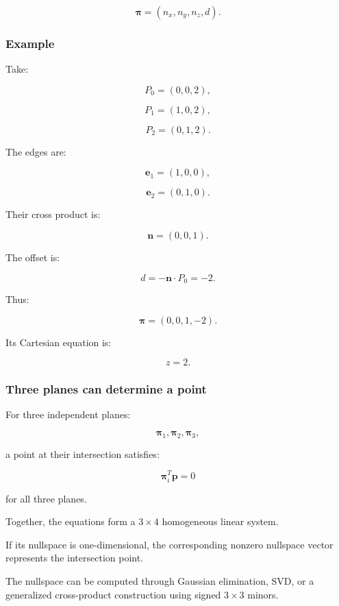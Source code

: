 \[
 \boxed{ \boldsymbol\pi= (n_x,n_y,n_z,d) }.
\]

\begin{allmightroleexample}

\subsubsection{Example}\label{02-foundations-ii-ch032-example}

Take:

\end{allmightroleexample}

\[
 P_0=(0,0,2),
\]

\[
 P_1=(1,0,2),
\]

\[
 P_2=(0,1,2).
\]

The edges are:

\[
 \mathbf e_1=(1,0,0),
\]

\[
 \mathbf e_2=(0,1,0).
\]

Their cross product is:

\[
 \mathbf n=(0,0,1).
\]

The offset is:

\[
 d=-\mathbf n\cdot P_0=-2.
\]

Thus:

\[
 \boxed{ \boldsymbol\pi=(0,0,1,-2) }.
\]

Its Cartesian equation is:

\[
 \boxed{z=2}.
\]

\subsubsection{Three planes can determine a point}\label{02-foundations-ii-ch032-three-planes-can-determine-a-point}

For three independent planes:

\[
 \boldsymbol\pi_1,\boldsymbol\pi_2,\boldsymbol\pi_3,
\]

a point at their intersection satisfies:

\[
 \boldsymbol\pi_i^T\mathbf p=0
\]

for all three planes.

Together, the equations form a \(3\times4\) homogeneous linear system.

If its nullspace is one-dimensional, the corresponding nonzero nullspace vector represents the intersection point.

The nullspace can be computed through Gaussian elimination, SVD, or a generalized cross-product construction using signed \(3\times3\) minors.

